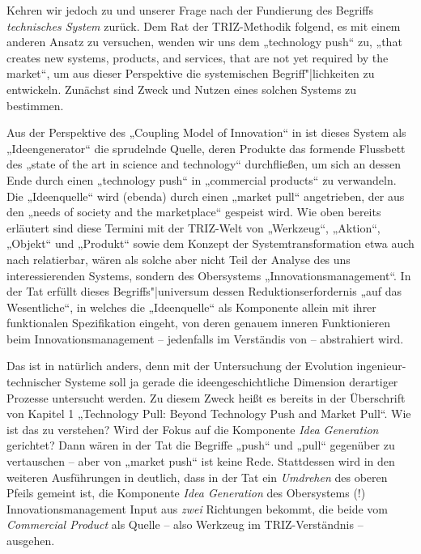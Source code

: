 \documentclass[11pt,a4paper]{article}
\begin{document}
Kehren wir jedoch zu \cite{TESE2018} und unserer Frage nach der Fundierung des
Begriffs \emph{technisches System} zurück. Dem Rat der TRIZ-Methodik folgend,
es mit einem anderen Ansatz zu versuchen, wenden wir uns dem „technology push“
\cite[S. 2]{TESE2018} zu, „that creates new systems, products, and services,
that are not yet required by the market“, um aus dieser Perspektive die
systemischen Begriff"|lichkeiten zu entwickeln.  Zunächst sind Zweck und
Nutzen eines solchen Systems zu bestimmen.

Aus der Perspektive des „Coupling Model of Innovation“ in
\cite[Fig. 3]{Preez2006} ist dieses System als „Ideengenerator“ die sprudelnde
Quelle, deren Produkte das formende Flussbett des „state of the art in science
and technology“ durchfließen, um sich an dessen Ende durch einen „technology
push“ in „commercial products“ zu verwandeln.  Die „Ideenquelle“ wird (ebenda)
durch einen „market pull“ angetrieben, der aus den „needs of society and the
marketplace“ gespeist wird. Wie oben bereits erläutert sind diese Termini mit
der TRIZ-Welt von „Werkzeug“, „Aktion“, „Objekt“ und „Produkt“ sowie dem
Konzept der Systemtransformation etwa auch nach \cite{TT} relatierbar, wären
als solche aber nicht Teil der Analyse des uns interessierenden Systems,
sondern des Obersystems „Innovationsmanagement“. In der Tat erfüllt dieses
Begriffs"|universum dessen Reduktionserfordernis „auf das Wesentliche“, in
welches die „Ideenquelle“ als Komponente allein mit ihrer funktionalen
Spezifikation eingeht, von deren genauem inneren Funktionieren beim
Innovationsmanagement -- jedenfalls im Verständis von \cite{Preez2006} --
abstrahiert wird.

Das ist in \cite{TESE2018} natürlich anders, denn mit der Untersuchung der
Evolution ingenieur-technischer Systeme soll ja gerade die ideengeschichtliche
Dimension derartiger Prozesse untersucht werden.  Zu diesem Zweck heißt es
bereits in der Überschrift von Kapitel 1 „Technology Pull: Beyond Technology
Push and Market Pull“.  Wie ist das zu verstehen? Wird der Fokus auf die
Komponente \emph{Idea Generation} gerichtet? Dann wären in der Tat die
Begriffe „push“ und „pull“ gegenüber \cite{Preez2006} zu vertauschen -- aber
von „market push“ ist keine Rede.  Stattdessen wird in den weiteren
Ausführungen in \cite{TESE2018} deutlich, dass in der Tat ein \emph{Umdrehen}
des oberen Pfeils gemeint ist, die Komponente \emph{Idea Generation} des
Obersystems (!) Innovationsmanagement Input aus \emph{zwei} Richtungen
bekommt, die beide vom \emph{Commercial Product} als Quelle -- also Werkzeug
im TRIZ-Verständnis -- ausgehen.
\end{document}
